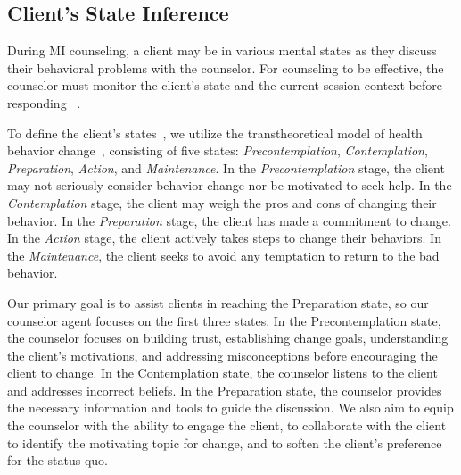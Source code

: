 \subsection{Client's State Inference}
\label{sec: state estimation}

During MI counseling, a client may be in various mental states as they discuss their behavioral problems with the counselor. For counseling to be effective, the counselor must monitor the client's state and the current session context before responding ~\citep{prochaska2005transtheoretical,prochaska2008initial}. 

To define the client's states~\citep{prochaska1997transtheoretical, hashemzadeh2019transtheoretical}, we utilize the transtheoretical model of health behavior change~\citep{prochaska2005transtheoretical,prochaska2008initial}, consisting of five states: {\em Precontemplation}, {\em Contemplation}, {\em Preparation}, {\em Action}, and {\em Maintenance}.  In the {\em Precontemplation} stage, the client may not seriously consider behavior change nor be motivated to seek help. In the {\em Contemplation} stage, the client may weigh the pros and cons of changing their behavior. In the {\em Preparation} stage, the client has made a commitment to change. In the {\em Action} stage, the client actively takes steps to change their behaviors. In the {\em Maintenance}, the client seeks to avoid any temptation to return to the bad behavior. 

Our primary goal is to assist clients in reaching the Preparation state, so our counselor agent focuses on the first three states. In the Precontemplation state, the counselor focuses on building trust, establishing change goals, understanding the client's motivations, and addressing misconceptions before encouraging the client to change. In the Contemplation state, the counselor listens to the client and addresses incorrect beliefs. In the Preparation state, the counselor provides the necessary information and tools to guide the discussion. 
We also aim to equip the counselor with the ability to %
engage the client, to collaborate with the client to identify the motivating topic for change, and to soften the client's preference for the status quo.

